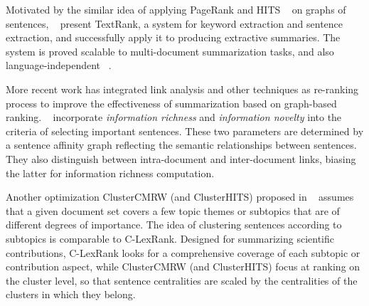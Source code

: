Motivated by the similar idea of applying PageRank and HITS
~\cite{Kleinberg:1999} on graphs of sentences,
~ present TextRank, a system for keyword
extraction and sentence extraction, and successfully apply it to
producing extractive summaries.  The system is proved scalable to
multi-document summarization tasks, and also language-independent
~\cite{Mihalcea2005}.

More recent work has integrated link analysis and other techniques as
re-ranking process to improve the effectiveness of summarization based
on graph-based ranking. ~ incorporate
\emph{information richness} and \emph{information novelty} into the
criteria of selecting important sentences. These two parameters are
determined by a sentence affinity graph reflecting the semantic
relationships between sentences. They also distinguish between
intra-document and inter-document links, biasing the latter for
information richness computation.

Another optimization ClusterCMRW (and ClusterHITS) proposed in
~\cite{Wan2008a} assumes that a given document set covers a few topic
themes or subtopics that are of different degrees of importance. The
idea of clustering sentences according to subtopics is comparable to
C-LexRank. Designed for summarizing scientific contributions,
C-LexRank looks for a comprehensive coverage of each subtopic or
contribution aspect, while ClusterCMRW (and ClusterHITS) focus at
ranking on the cluster level, so that sentence centralities are scaled
by the centralities of the clusters in which they belong.


